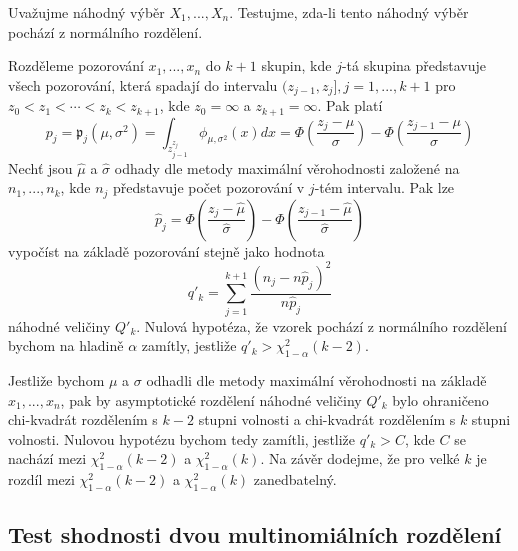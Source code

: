 \begin{example}
Uvažujme náhodný výběr $X_1, ..., X_n$. Testujme, zda-li tento náhodný výběr pochází z normálního rozdělení.

Rozděleme pozorování $x_1, ..., x_n$ do $k + 1$ skupin, kde $j$-tá skupina představuje všech pozorování, která spadají do intervalu $(z_{j - 1}, z_j], j = 1, ..., k + 1$ pro $z_0 < z_1 < \cdots < z_k < z_{k + 1}$, kde $z_0 = \infty$ a $z_{k + 1} = \infty$. Pak platí
\begin{equation*}
p_j = \mathfrak{p}_j(\mu, \sigma^2) = \int_{z_{j - 1}^{z_j}}\phi_{\mu, \sigma^2}(x)dx = \Phi\left(\frac{z_j - \mu}{\sigma}\right) - \Phi\left(\frac{z_{j - 1} - \mu}{\sigma}\right)
\end{equation*}
Nechť jsou $\hat{\mu}$ a $\hat{\sigma}$ odhady dle metody maximální věrohodnosti založené na $n_1, ..., n_k$, kde $n_j$ představuje počet pozorování v $j$-tém intervalu. Pak lze
\begin{equation*}
\hat{p}_j  = \Phi\left(\frac{z_j - \hat{\mu}}{\hat{\sigma}}\right) - \Phi \left(\frac{z_{j-1} - \hat{\mu}}{\hat{\sigma}}\right)
\end{equation*}
vypočíst na základě pozorování stejně jako hodnota
\begin{equation*}
q'_k = \sum_{j = 1}^{k + 1} \frac{(n_j - n \hat{p}_j)^2}{n \hat{p}_j}
\end{equation*}
náhodné veličiny $Q'_k$. Nulová hypotéza, že vzorek pochází z normálního rozdělení bychom na hladině $\alpha$ zamítly, jestliže $q'_k > \chi^2_{1 - \alpha}(k - 2)$.

Jestliže bychom $\mu$ a $\sigma$ odhadli dle metody maximální věrohodnosti na základě $x_1, ..., x_n$, pak by asymptotické rozdělení náhodné veličiny $Q'_k$ bylo ohraničeno chi-kvadrát rozdělením s $k - 2$ stupni volnosti a chi-kvadrát rozdělením s $k$ stupni volnosti. Nulovou hypotézu bychom tedy zamítli, jestliže $q'_k > C$, kde $C$ se nachází mezi $\chi^2_{1 - \alpha}(k - 2)$ a $\chi_{1 - \alpha}^2(k)$. Na závěr dodejme, že pro velké $k$ je rozdíl mezi $\chi^2_{1 - \alpha}(k - 2)$ a $\chi_{1 - \alpha}^2(k)$ zanedbatelný.
\end{example}

\subsection{Test shodnosti dvou multinomiálních rozdělení}

